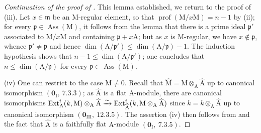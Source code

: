 \begin{proof}[Continuation of the proof of ]
This lemma established, we return to the proof of (iii).
Let $x\in\mathfrak{m}$ be an $\mathrm{M}$-regular element, so that $\operatorname{prof}(\mathrm{M}/x\mathrm{M})=n-1$ by (ii); for every $\mathfrak{p}\in\operatorname{Ass}(\mathrm{M})$, it follows from the lemma that there is a prime ideal $\mathfrak{p}'$ associated to $\mathrm{M}/x\mathrm{M}$ and containing $\mathfrak{p}+x\mathrm{A}$; but as $x$ is $\mathrm{M}$-regular, we have $x\notin\mathfrak{p}$, whence $\mathfrak{p}'\neq\mathfrak{p}$ and hence $\dim(\mathrm{A}/\mathfrak{p}')\leq\dim(\mathrm{A}/\mathfrak{p})-1$.
The induction hypothesis shows that $n-1\leq\dim(\mathrm{A}/\mathfrak{p}')$; one concludes that $n\leq\dim(\mathrm{A}/\mathfrak{p})$ for every $\mathfrak{p}\in\operatorname{Ass}(\mathrm{M})$.

(iv) One can restrict to the case $\mathrm{M}\neq 0$.
Recall that $\widehat{\mathrm{M}}=\mathrm{M}\otimes_\mathrm{A}\widehat{\mathrm{A}}$ up to canonical isomorphism $(\mathbf{0}_\mathrm{I},~7.3.3)$; as $\widehat{\mathrm{A}}$ is a flat $\mathrm{A}$-module, there are canonical isomorphisms $\operatorname{Ext}^i_\mathrm{A}(k,\mathrm{M})\otimes_\mathrm{A}\widehat{\mathrm{A}}\xrightarrow{\sim}\operatorname{Ext}^i_{\widehat{\mathrm{A}}}(k,\mathrm{M}\otimes_\mathrm{A}\widehat{\mathrm{A}})$ since $k=k\otimes_\mathrm{A}\widehat{\mathrm{A}}$ up to canonical isomorphism $(\mathbf{0}_\mathrm{III},~12.3.5)$.
The assertion (iv) then follows from  and the fact that $\widehat{\mathrm{A}}$ is a faithfully flat $\mathrm{A}$-module $(\mathbf{0}_\mathrm{I},~7.3.5)$.
\end{proof}

